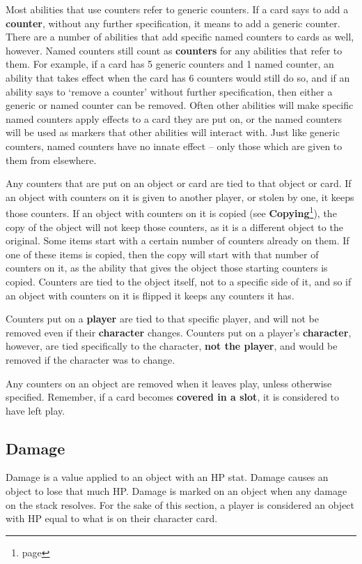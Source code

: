 \documentclass[10pt, a4paper, twoside]{article} %
\begin{document}
    Most abilities that use counters refer to generic counters. If a card says to add a \textbf{counter}, without any further specification, it means to add a generic counter. There are a number of abilities that add specific named counters to cards as well, however. Named counters still count as \textbf{counters} for any abilities that refer to them. For example, if a card has 5 generic counters and 1 named counter, an ability that takes effect when the card has 6 counters would still do so, and if an ability says to ‘remove a counter’ without further specification, then either a generic or named counter can be removed. Often other abilities will make specific named counters apply effects to a card they are put on, or the named counters will be used as markers that other abilities will interact with. Just like generic counters, named counters have no innate effect – only those which are given to them from elsewhere.

    Any counters that are put on an object or card are tied to that object or card. If an object with counters on it is given to another player, or stolen by one, it keeps those counters. If an object with counters on it is copied (see \textbf{Copying}\footnote{page \pageref{copying}}), the copy of the object will not keep those counters, as it is a different object to the original. Some items start with a certain number of counters already on them. If one of these items is copied, then the copy will start with that number of counters on it, as the ability that gives the object those starting counters is copied. Counters are tied to the object itself, not to a specific side of it, and so if an object with counters on it is flipped it keeps any counters it has.

    Counters put on a \textbf{player} are tied to that specific player, and will not be removed even if their \textbf{character} changes. Counters put on a player’s \textbf{character}, however, are tied specifically to the character, \textbf{not the player}, and would be removed if the character was to change.

    Any counters on an object are removed when it leaves play, unless otherwise specified. Remember, if a card becomes \textbf{covered in a slot}, it is considered to have left play.
    \subsection{Damage}
    Damage is a value applied to an object with an HP stat. Damage causes an object to lose that much HP. Damage is marked on an object when any damage on the stack resolves. For the sake of this section, a player is considered an object with HP equal to what is on their character card.
\end{document}
